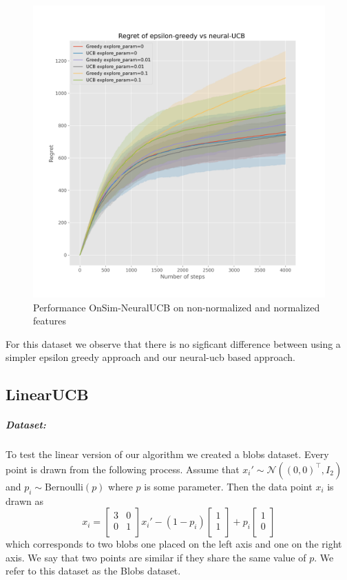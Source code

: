 \documentclass{article}
\begin{document}
\begin{figure}[!h]
\begin{minipage}{.45\textwidth}
    \includegraphics[width=\linewidth]{online-epsilon-vs-neural-reduced-normalized-ci}
  \end{minipage}
  \caption{Performance OnSim-NeuralUCB on non-normalized and normalized features}\label{fig:online-epsilon-vs-neural-ci}
\end{figure}

For this dataset we observe that there is no sigficant difference between using a simpler epsilon greedy approach
and our neural-ucb  based approach.
\subsection{LinearUCB}
\subparagraph{Dataset:}
To test the linear version of our algorithm we created a blobs dataset.
Every point is drawn from the following process. Assume that $x_i' \sim \mathcal{N}((0, 0)^\top,I_2)$ and $p_i \sim \text{Bernoulli}(p)$ where $p$ is
some parameter.
Then the data point $x_i$ is drawn as
\[x_i = \begin{bmatrix} 3 & 0\\ 0 & 1\\ \end{bmatrix} x_i' -(1-p_i)
\begin{bmatrix}
1\\
1\\
\end{bmatrix}
+ p_i
\begin{bmatrix}
1\\
0\\
\end{bmatrix}
\]
which corresponds to two blobs one placed on the left axis and one on the right axis.
We say that two points are similar if they share the same value of $p$.
We refer to this dataset as the Blobs dataset.
\end{document}
